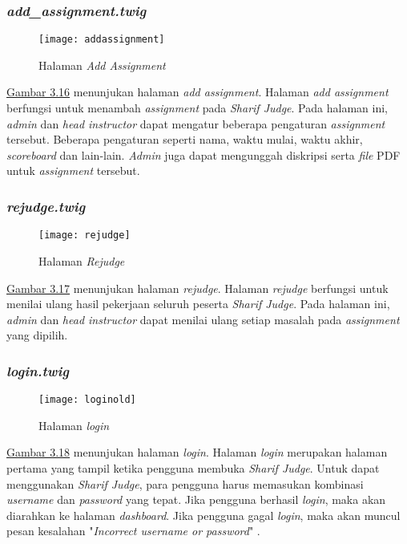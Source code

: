 \subsubsection{\textit{add\_assignment.twig}}
\begin{figure}[H]
	\centering  
	\texttt{[image: addassignment]}  
	\caption[Halaman \textit{Add Assignment}]{Halaman \textit{Add Assignment}} 
	\label{fig:addassignment} 
\end{figure} 
\hyperref[fig:addassignment]{Gambar 3.16} menunjukan halaman \textit{add assignment}. Halaman \textit{add assignment} berfungsi untuk menambah \textit{assignment} pada \textit{Sharif Judge}. Pada halaman ini, \textit{admin} dan \textit{head instructor} dapat mengatur beberapa pengaturan \textit{assignment} tersebut. Beberapa pengaturan seperti nama, waktu mulai, waktu akhir, \textit{scoreboard} dan lain-lain. \textit{Admin} juga dapat mengunggah diskripsi serta \textit{file} PDF untuk \textit{assignment} tersebut.

\subsubsection{\textit{rejudge.twig}}
\begin{figure}[H]
	\centering  
	\texttt{[image: rejudge]}  
	\caption[Halaman \textit{Rejudge}]{Halaman \textit{Rejudge}} 
	\label{fig:rejudge} 
\end{figure} 
\hyperref[fig:rejudge]{Gambar 3.17} menunjukan halaman \textit{rejudge}. Halaman \textit{rejudge} berfungsi untuk menilai ulang hasil pekerjaan seluruh peserta \textit{Sharif Judge}. Pada halaman ini, \textit{admin} dan \textit{head instructor} dapat menilai ulang setiap masalah pada \textit{assignment} yang dipilih.

\subsubsection{\textit{login.twig}}
\begin{figure}[H]
	\centering  
	\texttt{[image: loginold]}  
	\caption[Halaman \textit{Login}]{Halaman \textit{login}} 
	\label{fig:oldlogin} 
\end{figure} 
\hyperref[fig:oldlogin]{Gambar 3.18} menunjukan halaman \textit{login}. Halaman \textit{login} merupakan halaman pertama yang tampil ketika pengguna membuka \textit{Sharif Judge}. Untuk dapat menggunakan \textit{Sharif Judge}, para pengguna harus memasukan kombinasi \textit{username} dan \textit{password} yang tepat. Jika pengguna berhasil \textit{login}, maka akan diarahkan ke halaman \textit{dashboard}. Jika pengguna gagal \textit{login}, maka akan muncul pesan kesalahan "\textit{Incorrect username or password}" .

